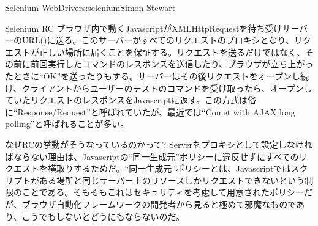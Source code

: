 \begin{aosachapter}{Selenium WebDriver}{s:selenium}{Simon Stewart}
\begin{aosasect1}{Selenium RC}
ブラウザ内で動くJavascriptがXMLHttpRequestを待ち受けサーバーのURL()に送る。このサーバーがすべてのリクエストのプロキシとなり、リクエストが正しい場所に届くことを保証する。リクエストを送るだけではなく、その前に前回実行したコマンドのレスポンスを送信したり、ブラウザが立ち上がったときに``OK''を送ったりもする。サーバーはその後リクエストをオープンし続け、クライアントからユーザーのテストのコマンドを受け取ったら、オープンしていたリクエストのレスポンスをJavascriptに返す。この方式は俗に``Response/Request''と呼ばれていたが、最近では``Comet with AJAX long polling''と呼ばれることが多い。

なぜRCの挙動がそうなっているのかって? Serverをプロキシとして設定しなければならない理由は、Javascriptの``同一生成元''ポリシーに違反せずにすべてのリクエストを横取りするためだ。``同一生成元''ポリシーとは、Javascriptではスクリプトがある場所と同じサーバー上のリソースしかリクエストできないという制限のことである。そもそもこれはセキュリティを考慮して用意されたポリシーだが、ブラウザ自動化フレームワークの開発者から見ると極めて邪魔なものであり、こうでもしないとどうにもならないのだ。


\end{aosasect1}
\end{aosachapter}
